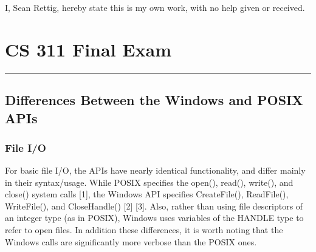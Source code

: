 \documentclass[letterpaper,10pt,fleqn]{article}
\def\name{Sean Rettig}
\numberwithin{equation}{section}
\begin{document}
I, \name, hereby state this is my own work, with no help given or received.


\section*{CS 311 Final Exam}
\hrule

\subsection*{Differences Between the Windows and POSIX APIs}

\subsubsection*{File I/O}

For basic file I/O, the APIs have nearly identical functionality, and differ mainly in their syntax/usage.  While POSIX specifies the open(), read(), write(), and close() system calls {[}1{]}, the Windows API specifies CreateFile(), ReadFile(), WriteFile(), and CloseHandle() {[}2{]} {[}3{]}.  Also, rather than using file descriptors of an integer type (as in POSIX), Windows uses variables of the HANDLE type to refer to open files.  In addition these differences, it is worth noting that the Windows calls are significantly more verbose than the POSIX ones.
\end{document}
